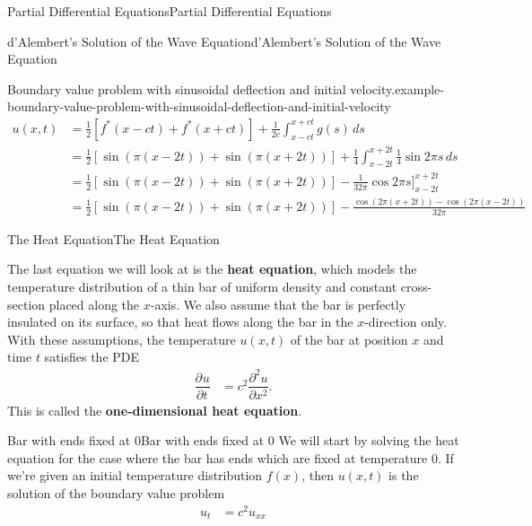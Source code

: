 \documentclass[10pt,]{book}
\newcommand{\terminology}[1]{\textbf{#1}}
\numberwithin{equation}{section}
\newcommand{\pdv}[3][]{\dfrac{\partial^{#1} #2}{\partial #3^{#1}}}
\begin{document}
\begin{chapterptx}{Partial Differential Equations}{}{Partial Differential Equations}{}{}
\begin{sectionptx}{d'Alembert's Solution of the Wave Equation}{}{d'Alembert's Solution of the Wave Equation}{}{}
\begin{example}{Boundary value problem with sinusoidal deflection and initial velocity.}{example-boundary-value-problem-with-sinusoidal-deflection-and-initial-velocity}
%
\begin{align*}
u(x,t) & = \frac{1}{2}[f^{*}(x-ct)+f^{*}(x+ct)] + \frac{1}{2c}\int_{x-ct}^{x+ct}g(s)\,ds \\
& = \frac{1}{2}[\sin(\pi(x-2t))+\sin(\pi(x+2t))] + \frac{1}{4}\int_{x-2t}^{x+2t}\frac{1}{4}\sin2\pi s\,ds \\
& = \frac{1}{2}[\sin(\pi(x-2t))+\sin(\pi(x+2t))] - \frac{1}{32\pi}\cos2\pi s\Bigg]_{x-2t}^{x+2t} \\
& = \frac{1}{2}[\sin(\pi(x-2t))+\sin(\pi(x+2t))] - \frac{\cos(2\pi(x+2t)) - \cos(2\pi(x-2t))}{32\pi} 
\end{align*}
\end{example}
\end{sectionptx}
%
%
\typeout{************************************************}
\typeout{************************************************}
%
\begin{sectionptx}{The Heat Equation}{}{The Heat Equation}{}{}\label{section-the-heat-equation}
\begin{introduction}{}%
\hypertarget{p-505}{}%
The last equation we will look at is the \terminology{heat equation}, which models the temperature distribution of a thin bar of uniform density and constant cross-section placed along the \(x\)-axis. We also assume that the bar is perfectly insulated on its surface, so that heat flows along the bar in the \(x\)-direction only. With these assumptions, the temperature \(u(x,t)\) of the bar at position \(x\) and time \(t\) satisfies the PDE%
%
\begin{align*}
\pdv{u}{t} & = c^{2}\pdv[2]{u}{x}. 
\end{align*}
\hypertarget{p-506}{}%
This is called the \terminology{one-dimensional heat equation}.%
\end{introduction}%
%
%
\typeout{************************************************}
\typeout{************************************************}
%
\begin{subsectionptx}{Bar with ends fixed at \(0\)}{}{Bar with ends fixed at \(0\)}{}{}\label{subsection-bar-with-ends-fixed-at-}
\hypertarget{p-507}{}%
We will start by solving the heat equation for the case where the bar has ends which are fixed at temperature \(0\). If we're given an initial temperature distribution \(f(x)\), then \(u(x,t)\) is the solution of the boundary value problem%
%
\begin{align}
u_{t} & = c^{2}u_{xx} \label{equation-one-dimensional-heat-equation}\\

\end{align}
\end{subsectionptx}
\end{sectionptx}
\end{chapterptx}
\end{document}
